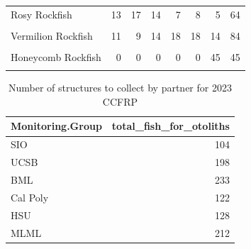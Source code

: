 \documentclass[
]{article}
\begin{document}
\begin{table}
\begin{tabular}[t]{lrrrrrrr}
Rosy Rockfish & 13 & 17 & 14 & 7 & 8 & 5 & 64\\
\cellcolor{gray!6}{Treefish} & \cellcolor{gray!6}{0} & \cellcolor{gray!6}{0} & \cellcolor{gray!6}{4} & \cellcolor{gray!6}{7} & \cellcolor{gray!6}{19} & \cellcolor{gray!6}{9} & \cellcolor{gray!6}{39}\\
\addlinespace
Vermilion Rockfish & 11 & 9 & 14 & 18 & 18 & 14 & 84\\
\cellcolor{gray!6}{Yellowtail Rockfish} & \cellcolor{gray!6}{20} & \cellcolor{gray!6}{14} & \cellcolor{gray!6}{12} & \cellcolor{gray!6}{6} & \cellcolor{gray!6}{0} & \cellcolor{gray!6}{0} & \cellcolor{gray!6}{52}\\
Honeycomb Rockfish & 0 & 0 & 0 & 0 & 0 & 45 & 45\\
\cellcolor{gray!6}{Starry Rockfish} & \cellcolor{gray!6}{0} & \cellcolor{gray!6}{0} & \cellcolor{gray!6}{0} & \cellcolor{gray!6}{0} & \cellcolor{gray!6}{4} & \cellcolor{gray!6}{0} & \cellcolor{gray!6}{4}\\
\bottomrule
\end{tabular}
\end{table}

\begin{table}

\caption{\label{tab:partnernumbers}Number of structures to collect by partner for 2023 CCFRP}
\centering
\begin{tabular}[t]{lr}
\toprule
Monitoring.Group & total\_fish\_for\_otoliths\\
\midrule
SIO & 104\\
UCSB & 198\\
BML & 233\\
Cal Poly & 122\\
HSU & 128\\
\addlinespace
MLML & 212\\
\bottomrule
\end{tabular}
\end{table}

\FloatBarrier

\clearpage
\newpage
\end{document}
